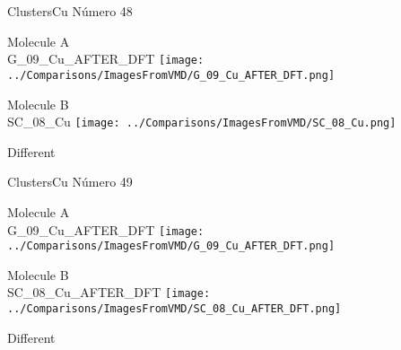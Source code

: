  \newpage

\vtab[-3cm]
\begin{center}
{\large ClustersCu \tab Número 48}
\end{center}
\begin{multicols}{2}
\begin{center}
Molecule A \\ 
G\_09\_Cu\_AFTER\_DFT
\texttt{[image: ../Comparisons/ImagesFromVMD/G\_09\_Cu\_AFTER\_DFT.png]}
\\
\vtab

\columnbreak
Molecule B \\ 
SC\_08\_Cu
\texttt{[image: ../Comparisons/ImagesFromVMD/SC\_08\_Cu.png]}
\\
\vtab


\end{center}
\end{multicols}
\begin{center}
\textcolor{NavyBlue}{\Large Different}
\end{center}

 \newpage

\vtab[-3cm]
\begin{center}
{\large ClustersCu \tab Número 49}
\end{center}
\begin{multicols}{2}
\begin{center}
Molecule A \\ 
G\_09\_Cu\_AFTER\_DFT
\texttt{[image: ../Comparisons/ImagesFromVMD/G\_09\_Cu\_AFTER\_DFT.png]}
\\
\vtab

\columnbreak
Molecule B \\ 
SC\_08\_Cu\_AFTER\_DFT
\texttt{[image: ../Comparisons/ImagesFromVMD/SC\_08\_Cu\_AFTER\_DFT.png]}
\\
\vtab


\end{center}
\end{multicols}
\begin{center}
\textcolor{NavyBlue}{\Large Different}
\end{center}

 \newpage

